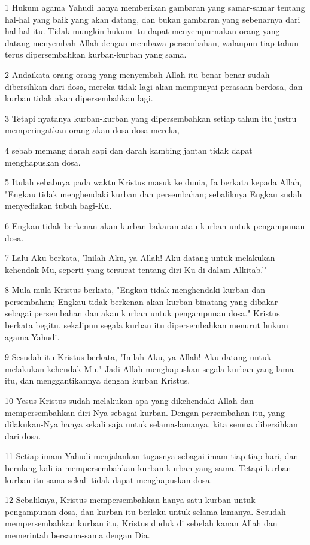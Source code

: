 \par 1 Hukum agama Yahudi hanya memberikan gambaran yang samar-samar tentang hal-hal yang baik yang akan datang, dan bukan gambaran yang sebenarnya dari hal-hal itu. Tidak mungkin hukum itu dapat menyempurnakan orang yang datang menyembah Allah dengan membawa persembahan, walaupun tiap tahun terus dipersembahkan kurban-kurban yang sama.
\par 2 Andaikata orang-orang yang menyembah Allah itu benar-benar sudah dibersihkan dari dosa, mereka tidak lagi akan mempunyai perasaan berdosa, dan kurban tidak akan dipersembahkan lagi.
\par 3 Tetapi nyatanya kurban-kurban yang dipersembahkan setiap tahun itu justru memperingatkan orang akan dosa-dosa mereka,
\par 4 sebab memang darah sapi dan darah kambing jantan tidak dapat menghapuskan dosa.
\par 5 Itulah sebabnya pada waktu Kristus masuk ke dunia, Ia berkata kepada Allah, "Engkau tidak menghendaki kurban dan persembahan; sebaliknya Engkau sudah menyediakan tubuh bagi-Ku.
\par 6 Engkau tidak berkenan akan kurban bakaran atau kurban untuk pengampunan dosa.
\par 7 Lalu Aku berkata, 'Inilah Aku, ya Allah! Aku datang untuk melakukan kehendak-Mu, seperti yang tersurat tentang diri-Ku di dalam Alkitab.'"
\par 8 Mula-mula Kristus berkata, "Engkau tidak menghendaki kurban dan persembahan; Engkau tidak berkenan akan kurban binatang yang dibakar sebagai persembahan dan akan kurban untuk pengampunan dosa." Kristus berkata begitu, sekalipun segala kurban itu dipersembahkan menurut hukum agama Yahudi.
\par 9 Sesudah itu Kristus berkata, "Inilah Aku, ya Allah! Aku datang untuk melakukan kehendak-Mu." Jadi Allah menghapuskan segala kurban yang lama itu, dan menggantikannya dengan kurban Kristus.
\par 10 Yesus Kristus sudah melakukan apa yang dikehendaki Allah dan mempersembahkan diri-Nya sebagai kurban. Dengan persembahan itu, yang dilakukan-Nya hanya sekali saja untuk selama-lamanya, kita semua dibersihkan dari dosa.
\par 11 Setiap imam Yahudi menjalankan tugasnya sebagai imam tiap-tiap hari, dan berulang kali ia mempersembahkan kurban-kurban yang sama. Tetapi kurban-kurban itu sama sekali tidak dapat menghapuskan dosa.
\par 12 Sebaliknya, Kristus mempersembahkan hanya satu kurban untuk pengampunan dosa, dan kurban itu berlaku untuk selama-lamanya. Sesudah mempersembahkan kurban itu, Kristus duduk di sebelah kanan Allah dan memerintah bersama-sama dengan Dia.
